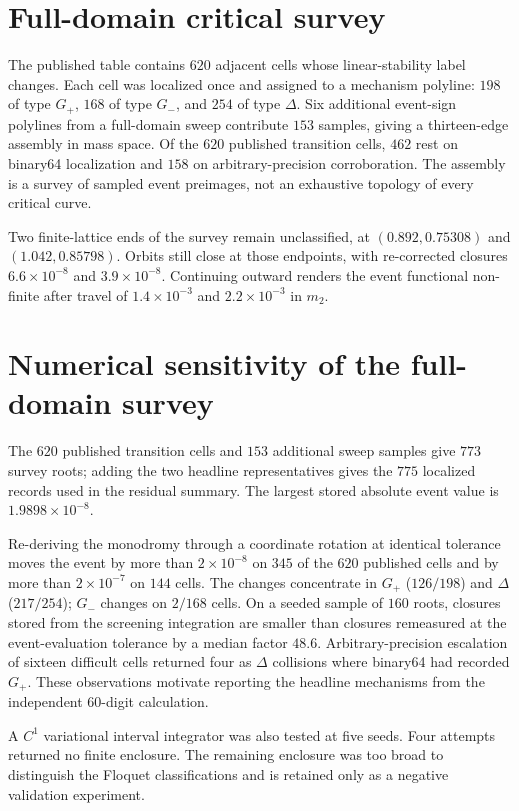 \documentclass[aps,prl,onecolumn,amsmath,amssymb]{revtex4-2}
\begin{document}
\section{Full-domain critical survey}

The published table contains $620$ adjacent cells whose linear-stability label
changes. Each cell was localized once and assigned to a mechanism polyline:
$198$ of type $G_+$, $168$ of type $G_-$, and $254$ of type $\Delta$. Six
additional event-sign polylines from a full-domain sweep contribute $153$
samples, giving a thirteen-edge assembly in mass space. Of the $620$ published
transition cells, $462$ rest on binary64 localization and $158$ on
arbitrary-precision corroboration. The assembly is a survey of sampled event
preimages, not an exhaustive topology of every critical curve.

Two finite-lattice ends of the survey remain unclassified, at
$(0.892,0.75308)$ and $(1.042,0.85798)$. Orbits still close at those endpoints,
with re-corrected closures $6.6\times10^{-8}$ and $3.9\times10^{-8}$.
Continuing outward renders the event functional non-finite after travel of
$1.4\times10^{-3}$ and $2.2\times10^{-3}$ in $m_2$.

\section{Numerical sensitivity of the full-domain survey}

The $620$ published transition cells and $153$ additional sweep samples give
$773$ survey roots; adding the two headline representatives gives the $775$
localized records used in the residual summary. The largest stored absolute
event value is $1.9898\times10^{-8}$.

Re-deriving the monodromy through a coordinate rotation at identical tolerance
moves the event by more than $2\times10^{-8}$ on $345$ of the $620$ published
cells and by more than $2\times10^{-7}$ on $144$ cells. The changes concentrate
in $G_+$ ($126/198$) and $\Delta$ ($217/254$); $G_-$ changes on $2/168$ cells.
On a seeded sample of $160$ roots, closures stored from the screening
integration are smaller than closures remeasured at the event-evaluation
tolerance by a median factor $48.6$. Arbitrary-precision escalation of sixteen
difficult cells returned four as $\Delta$ collisions where binary64 had
recorded $G_+$. These observations motivate reporting the headline mechanisms
from the independent $60$-digit calculation.

A $C^1$ variational interval integrator was also tested at five seeds. Four
attempts returned no finite enclosure. The remaining enclosure was too broad
to distinguish the Floquet classifications and is retained only as a negative
validation experiment.
\end{document}
